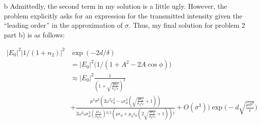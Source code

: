 \begin{homeworkProblem}
\begin{homeworkSection}{b}
	Admittedly, the second term in my solution is a little ugly. However, the problem explicitly asks for an expression for the transmitted intensity given the ``leading order'' in the approximation of $\sigma$. Thus, my final solution for problem 2 part b) is as follows:
	\\
	
	\begin{problemAnswer}{
	\begin{align*}
	|E_0|^2 |1/(1+n_2)|^2 &\exp(-2d/\delta) \\ &= |E_0|^2 \Big( 1/(1+A^2-2A\cos\phi)\Big) \\ 
	& \approx |E_0|^2 \frac{1}{(1+\sqrt{\frac{\mu  \epsilon_{d}}{\mu _0 \epsilon _0}})^2} \\
	&+\frac{\mu ^2
   \sigma ^2 \left(2 \omega ^2 \epsilon_{d}^2-\omega \epsilon_{d}^2 \left(\sqrt{\frac{\mu  \epsilon_{d}}{\mu _0 \epsilon
   _0}}+1\right)\right)}{2 \omega ^2 \omega \epsilon_{d}^2 \left(\frac{\mu  \epsilon_{d}}{\mu _0 \epsilon
   _0}\right){}^{3/2} \left(\mu  \epsilon_{d}+\mu _0 \epsilon _0 \left(2 \sqrt{\frac{\mu  \epsilon_{d}}{\mu _0 \epsilon
   _0}}+1\right)\right){}^2}+O\left(\sigma ^3\right) \Big)\exp \Big(-d\sqrt{\frac{\mu\sigma^2}{\epsilon}}\Big)
	\end{align*}
	}
	\end{problemAnswer}
\end{homeworkSection}
\end{homeworkProblem}

